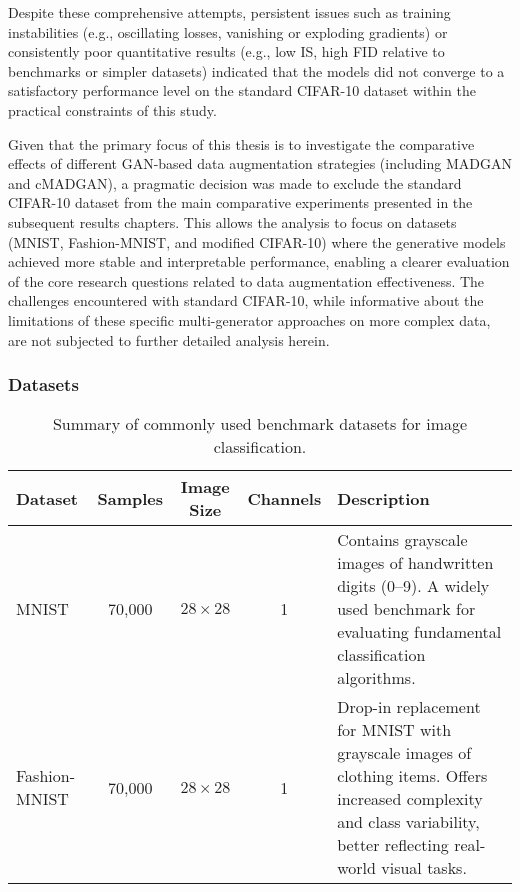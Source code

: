 Despite these comprehensive attempts, persistent issues such as training instabilities (e.g., oscillating losses, vanishing or exploding gradients) or consistently poor quantitative results (e.g., low IS, high FID relative to benchmarks or simpler datasets) indicated that the models did not converge to a satisfactory performance level on the standard CIFAR-10 dataset within the practical constraints of this study.

Given that the primary focus of this thesis is to investigate the comparative effects of different GAN-based data augmentation strategies (including MADGAN and cMADGAN), a pragmatic decision was made to exclude the standard CIFAR-10 dataset from the main comparative experiments presented in the subsequent results chapters. This allows the analysis to focus on datasets (MNIST, Fashion-MNIST, and modified CIFAR-10) where the generative models achieved more stable and interpretable performance, enabling a clearer evaluation of the core research questions related to data augmentation effectiveness. The challenges encountered with standard CIFAR-10, while informative about the limitations of these specific multi-generator approaches on more complex data, are not subjected to further detailed analysis herein.

\subsubsection{Datasets}

\begin{table}[H]
    \centering
    \vspace{-1.5em}
    \caption{Summary of commonly used benchmark datasets for image classification.}
    \label{tab:dataset_summary}
    \begin{tabular}{|p{1.8cm}|c|c|c|p{6cm}|} %
        \hline
        \textbf{Dataset} & \textbf{Samples} & \textbf{Image Size} & \textbf{Channels} & \textbf{Description} \\
        \hline
        MNIST & 70,000 & $28 \times 28$ & 1 & Contains grayscale images of handwritten digits (0–9). A widely used benchmark for evaluating fundamental classification algorithms. \\
        \hline
        Fashion-MNIST & 70,000 & $28 \times 28$ & 1 & Drop-in replacement for MNIST with grayscale images of clothing items. Offers increased complexity and class variability, better reflecting real-world visual tasks. \\
        \hline
    \end{tabular}
\end{table}


